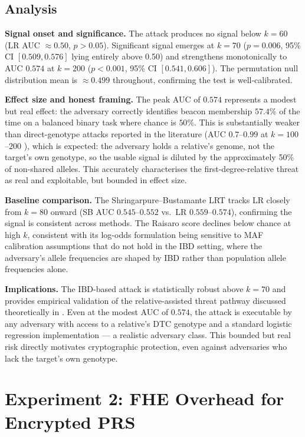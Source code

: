 \documentclass[conference]{IEEEtran}
\begin{document}
\subsection{Analysis}

\textbf{Signal onset and significance.} The attack produces no signal below
$k=60$ (LR AUC $\approx 0.50$, $p>0.05$). Significant signal emerges at
$k=70$ ($p=0.006$, 95\% CI $[0.509, 0.576]$ lying entirely above 0.50) and
strengthens monotonically to AUC $0.574$ at $k=200$ ($p<0.001$, 95\% CI
$[0.541, 0.606]$). The permutation null distribution mean is $\approx 0.499$
throughout, confirming the test is well-calibrated.

\textbf{Effect size and honest framing.} The peak AUC of $0.574$ represents a
modest but real effect: the adversary correctly identifies beacon membership
$57.4\%$ of the time on a balanced binary task where chance is $50\%$. This is
substantially weaker than direct-genotype attacks reported in the literature
(AUC $0.7$--$0.99$ at $k=100$--$200$ \cite{shringarpure2015,vonthenen2019}),
which is expected: the adversary holds a relative's genome, not the target's
own genotype, so the usable signal is diluted by the approximately 50\% of
non-shared alleles. This accurately characterises the first-degree-relative
threat as real and exploitable, but bounded in effect size.

\textbf{Baseline comparison.} The Shringarpure--Bustamante LRT tracks LR
closely from $k=80$ onward (SB AUC $0.545$--$0.552$ vs.\ LR $0.559$--$0.574$),
confirming the signal is consistent across methods. The Raisaro score declines
below chance at high $k$, consistent with its log-odds formulation being
sensitive to MAF calibration assumptions that do not hold in the IBD setting,
where the adversary's allele frequencies are shaped by IBD rather than
population allele frequencies alone.

\textbf{Implications.} The IBD-based attack is statistically robust above
$k=70$ and provides empirical validation of the relative-assisted threat
pathway discussed theoretically in \cite{gymrek2013,erlich2014}. Even at the
modest AUC of $0.574$, the attack is executable by any adversary with access
to a relative's DTC genotype and a standard logistic regression implementation
--- a realistic adversary class. This bounded but real risk directly motivates
cryptographic protection, even against adversaries who lack the target's own
genotype.

\section{Experiment 2: FHE Overhead for Encrypted PRS}
\end{document}
